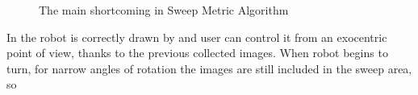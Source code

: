 \begin{figure}[htp]
\begin{center}
    \hspace*{15pt}

    \vspace*{1pt}

  \end{center}
  \caption{The main shortcoming in Sweep Metric Algorithm}
  \label{fig:ASM_explain}
\end{figure}
In  the robot is correctly drawn by \framework{}
and user can control it from an exocentric point of view, thanks to
the previous collected images. When robot begins to turn, for narrow
angles of rotation the images are still included in the sweep area, so

